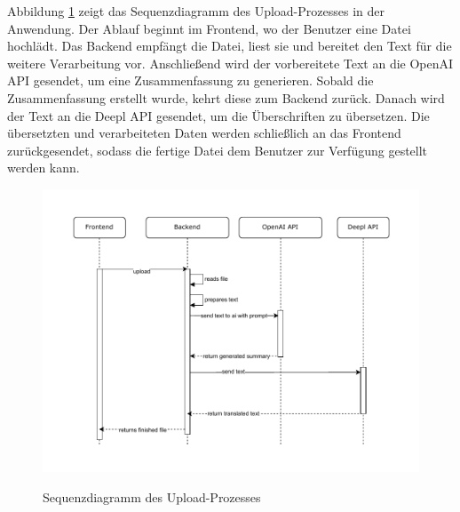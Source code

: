 Abbildung \ref{fig:Sequenzdiagramm} zeigt das Sequenzdiagramm des Upload-Prozesses in der Anwendung. Der Ablauf beginnt im Frontend, wo der Benutzer eine Datei hochlädt. Das Backend empfängt die Datei, liest sie und bereitet den Text für die weitere Verarbeitung vor. Anschließend wird der vorbereitete Text an die OpenAI \ac{API} gesendet, um eine Zusammenfassung zu generieren. Sobald die Zusammenfassung erstellt wurde, kehrt diese zum Backend zurück. Danach wird der Text an die Deepl \ac{API} gesendet, um die Überschriften zu übersetzen. Die übersetzten und verarbeiteten Daten werden schließlich an das Frontend zurückgesendet, sodass die fertige Datei dem Benutzer zur Verfügung gestellt werden kann.

\begin{figure}[H]
\centering
\includegraphics[width=1\linewidth]{Images/Sequenzdiagramm.pdf}\\
\caption{Sequenzdiagramm des Upload-Prozesses}
\label{fig:Sequenzdiagramm}
\end{figure}



